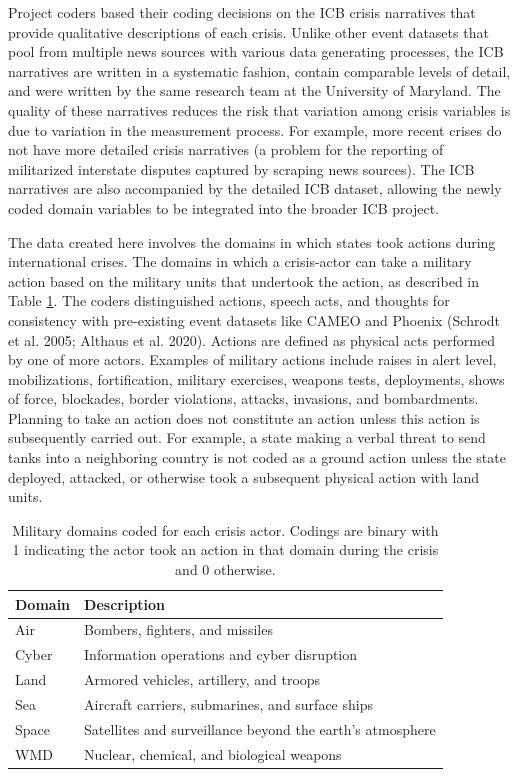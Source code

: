 \documentclass[
]{article}
\begin{document}
Project coders based their coding decisions on the ICB crisis narratives that provide qualitative descriptions of each crisis. Unlike other event datasets that pool from multiple news sources with various data generating processes, the ICB narratives are written in a systematic fashion, contain comparable levels of detail, and were written by the same research team at the University of Maryland. The quality of these narratives reduces the risk that variation among crisis variables is due to variation in the measurement process. For example, more recent crises do not have more detailed crisis narratives (a problem for the reporting of militarized interstate disputes captured by scraping news sources). The ICB narratives are also accompanied by the detailed ICB dataset, allowing the newly coded domain variables to be integrated into the broader ICB project.

The data created here involves the domains in which states took actions during international crises. The domains in which a crisis-actor can take a military action based on the military units that undertook the action, as described in Table \ref{tab:domains}. The coders distinguished actions, speech acts, and thoughts for consistency with pre-existing event datasets like CAMEO and Phoenix (Schrodt et al. 2005; Althaus et al. 2020). Actions are defined as physical acts performed by one of more actors. Examples of military actions include raises in alert level, mobilizations, fortification, military exercises, weapons tests, deployments, shows of force, blockades, border violations, attacks, invasions, and bombardments. Planning to take an action does not constitute an action unless this action is subsequently carried out. For example, a state making a verbal threat to send tanks into a neighboring country is not coded as a ground action unless the state deployed, attacked, or otherwise took a subsequent physical action with land units.

\begin{table}[]
\caption{Military domains coded for each crisis actor. Codings are binary with 1 indicating the actor took an action in that domain during the crisis and 0 otherwise.}
\label{tab:domains}
\centering
\begin{tabular}{|l|l|}
\hline
\textbf{Domain} & \textbf{Description} \\
\hline
Air & Bombers, fighters, and missiles \\
Cyber & Information operations and cyber disruption \\
Land & Armored vehicles, artillery, and troops \\
Sea & Aircraft carriers, submarines, and surface ships \\
Space & Satellites and surveillance beyond the earth's atmosphere \\
WMD & Nuclear, chemical, and biological weapons \\ 
\hline
\end{tabular}
\end{table}
\end{document}
